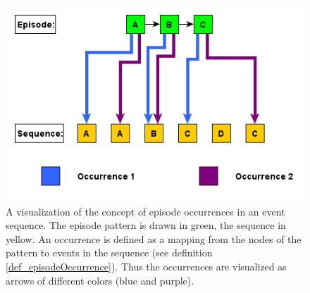 \begin{figure}[h]
	\centering
  	\includegraphics[width=\textwidth]{occurrenceExample}
	\caption{A visualization of the concept of episode occurrences in an event sequence. The episode pattern is drawn in green, the sequence in yellow. An occurrence is defined as a mapping from the nodes of the pattern to events in the sequence (see definition \ref{def_episodeOccurrence}). Thus the occurrences are visualized as arrows of different colors (blue and purple). }
	\label{fig_occurrenceExample}
\end{figure}


